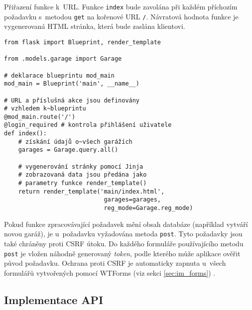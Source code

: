 \begin{listing}[htbp]
\caption{\label{lst:route} Přiřazení funkce k~URL. Funkce \texttt{index} bude zavolána při každém příchozím požadavku s~metodou \texttt{get} na kořenové URL \texttt{/}. Návratová hodnota funkce je vygenerovaná HTML stránka, která bude zaslána klientovi.}
\begin{verbatim}
from flask import Blueprint, render_template

from .models.garage import Garage 

# deklarace blueprintu mod_main
mod_main = Blueprint('main', __name__)

# URL a příslušná akce jsou definovány
# vzhledem k~blueprintu
@mod_main.route('/')
@login_required # kontrola přihlášení uživatele
def index():
    # získání údajů o~všech garážích
    garages = Garage.query.all()

    # vygenerování stránky pomocí Jinja
    # zobrazovaná data jsou předána jako
    # parametry funkce render_template()
    return render_template('main/index.html', 
                            garages=garages, 
                            reg_mode=Garage.reg_mode)
\end{verbatim}
\end{listing}

Pokud funkce zpracovávající požadavek mění obsah databáze (například vytváří novou garáž), je u~požadavku vyžadována metoda \texttt{post}. Tyto požadavky jsou také chráněny proti CSRF útoku. Do každého formuláře používajícího metodu \texttt{post} je vložen náhodně generovaný \textit{token}, podle kterého může aplikace ověřit původ požadavku. Ochrana proti CSRF je automaticky zapnuta u~všech formulářů vytvořených pomocí WTForms (viz sekci \ref{sec:im_forms}) \cite{flask_wtf}.


\subsection{Implementace API}


